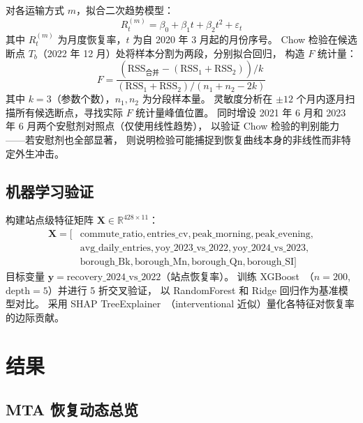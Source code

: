 \documentclass[runningheads]{llncs}
\begin{document}
对各运输方式 $m$，拟合二次趋势模型：
\begin{equation}
R_t^{(m)} = \beta_0 + \beta_1 t + \beta_2 t^2 + \varepsilon_t
\label{eq:quadratic}
\end{equation}
其中 $R_t^{(m)}$ 为月度恢复率，$t$ 为自 2020 年 3 月起的月份序号。
Chow 检验在候选断点 $T_b$（2022 年 12 月）处将样本分割为两段，分别拟合回归，
构造 $F$ 统计量：
\begin{equation}
F = \frac{(\text{RSS}_{\text{合并}} - (\text{RSS}_1 + \text{RSS}_2)) / k}
         {(\text{RSS}_1 + \text{RSS}_2) / (n_1 + n_2 - 2k)}
\label{eq:chow}
\end{equation}
其中 $k=3$（参数个数），$n_1, n_2$ 为分段样本量。
灵敏度分析在 $\pm 12$ 个月内逐月扫描所有候选断点，寻找实际 $F$ 统计量峰值位置。
同时增设 2021 年 6 月和 2023 年 6 月两个安慰剂对照点（仅使用线性趋势），
以验证 Chow 检验的判别能力——若安慰剂也全部显著，
则说明检验可能捕捉到恢复曲线本身的非线性而非特定外生冲击。

\subsection{机器学习验证}

构建站点级特征矩阵 $\mathbf{X} \in \mathbb{R}^{428 \times 11}$：
\begin{equation}
\begin{aligned}
\mathbf{X} = [&\text{commute\_ratio}, \text{entries\_cv}, \text{peak\_morning}, \text{peak\_evening},\\
              &\text{avg\_daily\_entries}, \text{yoy\_2023\_vs\_2022}, \text{yoy\_2024\_vs\_2023},\\
              &\text{borough\_Bk}, \text{borough\_Mn}, \text{borough\_Qn}, \text{borough\_SI}]
\end{aligned}
\end{equation}
目标变量 $\mathbf{y} = \text{recovery\_2024\_vs\_2022}$（站点恢复率）。
训练 XGBoost~\cite{chen2016}（$n=200$, $\text{depth}=5$）并进行 5 折交叉验证，
以 RandomForest 和 Ridge 回归作为基准模型对比。
采用 SHAP TreeExplainer~\cite{lundberg2017}（interventional 近似）量化各特征对恢复率的边际贡献。

\section{结果}

\subsection{MTA 恢复动态总览}
\end{document}
